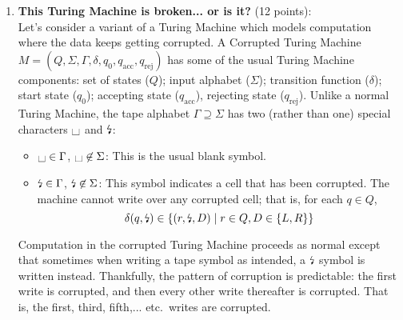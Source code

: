 \documentclass[12pt, oneside]{article}
\newcommand{\gradeCorrect}{({\it Graded for correctness}) }
\newcommand{\gradeCorrectFirst}{\gradeCorrect\footnote{This means your solution 
will be evaluated not only on the correctness of your answers, but on your ability
to present your ideas clearly and logically. You should explain how you 
arrived at your conclusions, using
mathematically sound reasoning. Whether you use formal proof techniques or 
write a more informal argument
for why something is true, your answers should always be well-supported. 
Your goal should be to convince the
reader that your results and methods are sound.} }
\newcommand{\blank}{\scalebox{1.5}{\textvisiblespace}}
\begin{document}
\begin{enumerate}
\begin{enumerate}
\item\gradeCorrectFirst Implementation-level description: English prose that 
describes the Turing machine head movements relative to contents of tape, 
and conditions for accepting / rejecting based on those contents.

\item\gradeCorrect Formal definition: Give the 7-tuple of parameters 
$$(Q, \Sigma, \Gamma, \delta, q_0, q_{\mathrm{acc}}, q_{\mathrm{rej}})$$ 
describing the Turing Machine. Represent the transition 
function $\delta$ by drawing the
state diagram of the Turing machine. You may use the following 
conventions: omit the reject state from the diagram; any missing 
transitions in the state diagram are assumed to go to the reject state.

\end{enumerate}



\item \textbf{This Turing Machine is broken... or is it?} 
(12 points): \\
Let's consider a variant of a Turing Machine which models computation 
where the data keeps getting corrupted. A Corrupted Turing Machine $M = 
(Q, \Sigma, \Gamma, \delta, q_0, q_{\mathrm{acc}}, q_{\mathrm{rej}})$ has 
some of the usual Turing Machine components: set of states ($Q$); input 
alphabet ($\Sigma$); transition function ($\delta$); start state ($q_0$); 
accepting state ($q_{\mathrm{acc}}$), rejecting state 
($q_{\mathrm{rej}}$). Unlike a normal Turing Machine, the tape alphabet 
$\Gamma  \supseteq \Sigma$ has two (rather than one) special characters $\blank$ and $\text{\lightning}$:
\begin{itemize}
\item $\blank \in \Gamma$, $\blank \not\in \Sigma$: This is the usual blank symbol. 
\item $\text{\lightning} \in \Gamma$, $\text{\lightning} \not\in \Sigma$: This symbol indicates a cell that 
has been corrupted. The machine cannot write over any corrupted cell; that is, for each $q \in Q$,
\[
\delta(q, \text{\lightning}) \in \{ (r, \text{\lightning}, D) \mid r \in Q, D \in \{L, R\} \}
\]
\end{itemize} 

Computation in the corrupted Turing Machine proceeds as normal except that sometimes when 
writing a tape symbol as intended, a $\text{\lightning}$ symbol is written instead. Thankfully, 
the pattern of corruption is predictable: the first write is corrupted, and then every 
other write thereafter is corrupted. That is, the first, third, fifth,... etc.\ writes are corrupted.


\end{enumerate}
\end{document}

